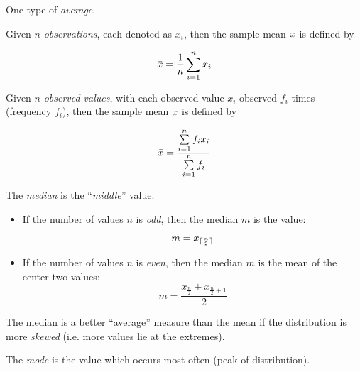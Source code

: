 \begin{definition}[Mean]
    One type of \textit{average}.
    
    Given $n$ \textit{observations}, each denoted as $x_i$, then the sample mean $\Bar{x}$ is defined by
    
    \begin{equation}\label{eq:mean}
        \Bar{x} = \frac{1}{n} \sum \limits_{i=1}^{n} x_i
    \end{equation}
    
    Given $n$ \textit{observed values}, with each observed value $x_i$ observed $f_i$ times (frequency $f_i$), then the sample mean $\Bar{x}$ is defined by
    
    \begin{equation}\label{eq:mean_freq}
        \Bar{x} = \frac{
            \sum \limits_{i=1}^{n} f_i x_i
        }{
            \sum \limits_{i=1}^{n} f_i
        }
    \end{equation}
\end{definition}

\begin{definition}[Median]
    The \textit{median} is the \enquote{\textit{middle}} value.
    
    \begin{itemize}
        \item If the number of values $n$ is \textit{odd}, then the median $m$ is the value:
        \begin{equation}
            m = x_{\lceil\frac{n}{2}\rceil}
        \end{equation}
        \item If the number of values $n$ is \textit{even}, then the median $m$ is the mean of the center two values:
        \begin{equation}
            m = \frac{
                x_{\frac{n}{2}} +
                x_{\frac{n}{2} + 1}
            }{2}
        \end{equation}
    \end{itemize}
    
    The median is a better \enquote{average} measure than the mean if the distribution is more \textit{skewed} (i.e. more values lie at the extremes).
\end{definition}

\begin{definition}[Mode]
    The \textit{mode} is the value which occurs most often (peak of distribution).
\end{definition}

